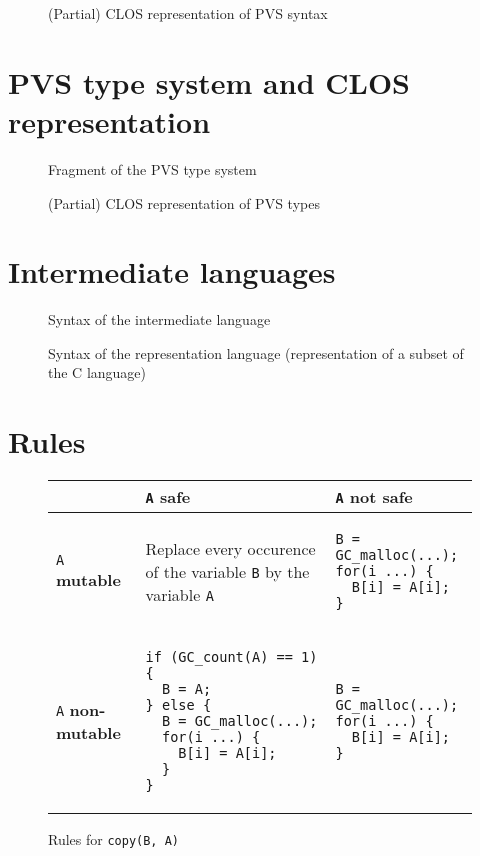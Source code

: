 \documentclass[12pt,a4paper]{article}
\newcommand{\cl}[1]{\texttt{#1}}
\newcommand{\mut}{  \textbf{ mutable } }
\newcommand{\nmut}{ \textbf{ non-mutable } }
\newcommand{\safe}{ \textbf{ safe } }
\begin{document}
\begin{figure}[!ht]

\caption{(Partial) CLOS representation of PVS syntax}
\label{fig:PVS-CLOS}
\end{figure}

\newpage
\section{PVS type system and CLOS representation}

\begin{figure}[!ht]

\caption{Fragment of the PVS type system}
\label{fig:PVS-types}
\end{figure}


\begin{figure}[!ht]

\caption{(Partial) CLOS representation of PVS types}
\label{fig:PVS-CLOS-types}
\end{figure}


\newpage
\section{Intermediate languages}

\begin{figure}[!ht]

\caption{Syntax of the intermediate language}
\label{fig:aux-syntax}
\end{figure}

\newpage
\begin{figure}[!ht]

\caption{Syntax of the representation language (representation of a subset of the C language)}
\label{fig:Csyntax}
\end{figure}



\newpage
\section{Rules}
\label{Rules}


\begin{figure}[!ht]
\begin{tabular}{|p{5.5cm}|p{5.5cm}|p{6cm}|}
\hline
             & \cl{A} \safe & \cl{A} not \safe \\ \hline
\cl{A} \mut  & Replace every occurence of the variable \cl{B} by the variable \cl{A} & \begin{lstlisting}
B = GC_malloc(...);
for(i ...) {
  B[i] = A[i];
}
\end{lstlisting} \\ \hline
\cl{A} \nmut & \begin{lstlisting}
if (GC_count(A) == 1) {
  B = A;
} else {
  B = GC_malloc(...);
  for(i ...) {
    B[i] = A[i];
  }
}
\end{lstlisting} & \begin{lstlisting}
B = GC_malloc(...);
for(i ...) {
  B[i] = A[i];
}
\end{lstlisting} \\ \hline
\end{tabular}
\caption{Rules for \cl{copy(B, A)}}
\end{figure}
\end{document}
